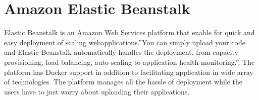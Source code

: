 \section{Amazon Elastic Beanstalk}
Elastic Beanstalk is an Amazon Web Services platform that enable for quick
and easy deployment of scaling webapplications.''You can simply upload your
code and Elastic Beanstalk automatically handles the deployment, from
capacity provisioning, load balancing, auto-scaling to application health
monitoring.''\cite{hid-sp18-411-amazonelasticbeanstalk}. The platform has
Docker support in addition to facilitating application in wide array of
technologies. The platform manages all the hassle of deployment while the
users have to just worry about uploading their applications.